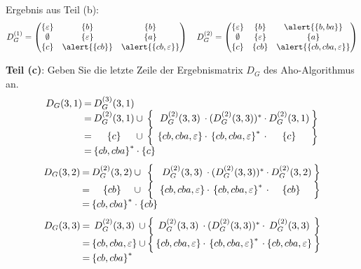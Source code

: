 \documentclass{beamer}
\begin{document}
\begin{frame}
	\footnotesize
	Ergebnis aus Teil (b):
	\begin{equation*}
	D_G^{(1)} = 
	\begin{pmatrix}
	\menge{\epsilon} & \menge{b} & \menge{b} \\
	\emptyset & \menge{\epsilon} & \menge{a} \\
	\menge{c} & \alert{\menge{cb}} & \alert{\menge{cb,\epsilon}}
	\end{pmatrix} 
	\quad 
	D_G^{(2)} = 
	\begin{pmatrix}
	\menge{\epsilon} & \menge{b} & \alert{\menge{b, ba}} \\
	\emptyset & \menge{\epsilon} & \menge{a} \\
	\menge{c} & \menge{cb} & \alert{\menge{cb, cba, \epsilon}}
	\end{pmatrix} 
	\end{equation*}
	
	\textbf{Teil (c)}: Geben Sie die letzte Zeile der Ergebnismatrix $D_G$ des Aho-Algorithmus an. \pause
	\begin{equation*}
	\setlength{\arraycolsep}{1pt}
	\begin{array}{rcccccccccc}
	D_G(3,1) &=& D_G^{(3)}(3,1) \\
	&=& D_G^{(2)}(3,1) &\cup& \Big\{ & D_G^{(2)}(3,3) &\cdot& (D_G^{(2)}(3,3))^\ast &\cdot& D_G^{(2)}(3,1) & \Big\}\\
	&=& \menge{c} &\cup& \Big\{ & \menge{cb,cba,\epsilon} &\cdot& \menge{cb,cba,\epsilon}^\ast &\cdot& \menge{c} & \Big\} \\
	&=& \multicolumn{3}{l}{\menge{cb,cba}^\ast \cdot \menge{c}}
	\end{array}
	\end{equation*}
	\pause
	\begin{equation*}
	\setlength{\arraycolsep}{1pt}
	\begin{array}{rcccccccccc}
	D_G(3,2)
	&=& D_G^{(2)}(3,2) &\cup& \Big\{ & D_G^{(2)}(3,3) &\cdot& (D_G^{(2)}(3,3))^\ast &\cdot& D_G^{(2)}(3,2) & \Big\}\\
	&=& \menge{cb} &\cup& \Big\{ & \menge{cb,cba,\epsilon} &\cdot& \menge{cb,cba,\epsilon}^\ast &\cdot& \menge{cb} & \Big\} \\
	&=& \multicolumn{3}{l}{\menge{cb,cba}^\ast \cdot \menge{cb}}
	\end{array}
	\end{equation*}
	\pause
	\begin{equation*}
	\setlength{\arraycolsep}{1pt}
	\begin{array}{rcccccccccc}
	D_G(3,3)
	&=& D_G^{(2)}(3,3) &\cup& \Big\{ & D_G^{(2)}(3,3) &\cdot& (D_G^{(2)}(3,3))^\ast &\cdot& D_G^{(2)}(3,3) & \Big\}\\
	&=& \menge{cb, cba, \epsilon} &\cup& \Big\{ & \menge{cb,cba,\epsilon} &\cdot& \menge{cb,cba,\epsilon}^\ast &\cdot& \menge{cb, cba, \epsilon} & \Big\} \\
	&=& \multicolumn{3}{l}{\menge{cb,cba}^\ast}
	\end{array}
	\end{equation*}
\end{frame}
\end{document}
